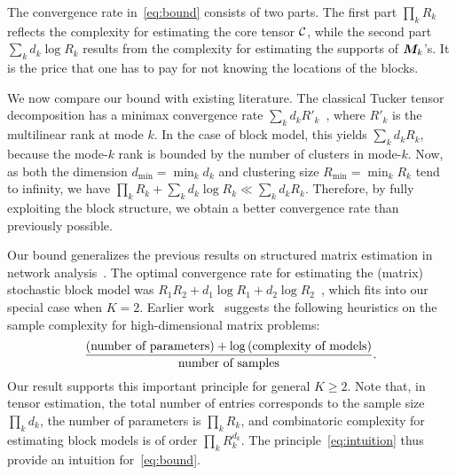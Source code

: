 \documentclass{article}
\newtheorem{theorem}{Theorem}
\begin{document}
The convergence rate in~\eqref{eq:bound} consists of two parts. The first part $\prod_k R_k$ reflects the complexity for estimating the core tensor $\mathcal{C}$, while the second part $\sum_k d_k \log R_k$ results from the complexity for estimating the supports of $\bm M_k$'s. It is the price that one has to pay for not knowing the locations of the blocks.  

We now compare our bound with existing literature. The classical Tucker tensor decomposition has a minimax convergence rate $\sum_kd_kR'_k$~\cite{zhang2018tensor}, where $R'_k$ is the multilinear rank at mode $k$. In the case of block model, this yields $\sum_kd_kR_k$, because the mode-$k$ rank is bounded by the number of clusters in mode-$k$. Now, as both the dimension $d_{\min}=\min_kd_k$ and clustering size $R_{\min}=\min_k R_k$ tend to infinity, we have $\prod_k R_k+ \sum_k d_k \log R_k\ll \sum_k d_k R_k$. Therefore, by fully exploiting the block structure, we obtain a better convergence rate than previously possible. 

Our bound generalizes the previous results on structured matrix estimation in network analysis~\cite{gao2016optimal,gao2018minimax}. The optimal convergence rate for estimating the (matrix) stochastic block model was $R_1R_2+d_1\log R_1+d_2\log R_2$~\cite{gao2016optimal}, which fits into our special case when $K=2$. 
Earlier work~\cite{gao2018minimax} suggests the following heuristics on the sample complexity for high-dimensional matrix problems:
\begin{equation}\label{eq:intuition}
{\text{(number of parameters)}+ \log \text{(complexity of models)}\over \text{number of samples}}.
\end{equation}
Our result supports this important principle for general $K\geq 2$. Note that, in tensor estimation, the total number of entries corresponds to the sample size $\prod_k d_k$, the number of parameters is $\prod_k R_k$, and combinatoric complexity for estimating block models is of order $\prod_k R_k^{d_k}$. The principle~\eqref{eq:intuition} thus provide an intuition for~\eqref{eq:bound}. 

\end{document}
